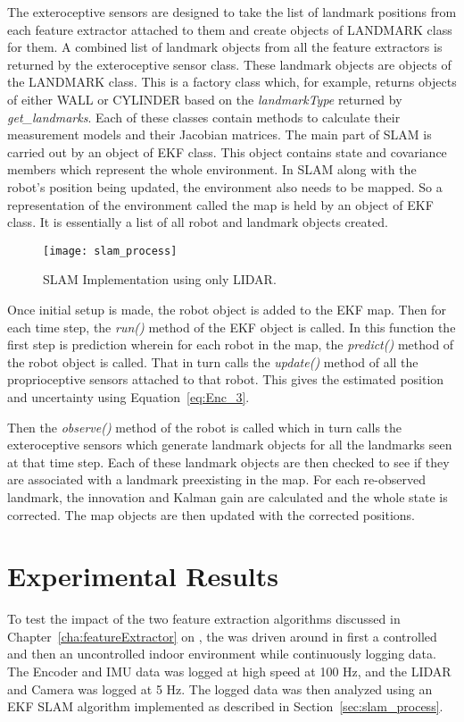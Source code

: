 The exteroceptive sensors are designed to take the list of landmark positions from each feature extractor attached to them and create objects of LANDMARK class for them. A combined list of landmark objects from all the feature extractors is returned by the exteroceptive sensor class. These landmark objects are objects of the LANDMARK class. This is a factory class which, for example, returns objects of either WALL or CYLINDER based on the \textit{landmarkType} returned by \textit{get\_landmarks}. Each of these classes contain methods to calculate their measurement models and their Jacobian matrices.
The main part of SLAM is carried out by an object of EKF class. This object contains  state and covariance members which represent the whole environment. In SLAM along with the robot's position being updated, the environment also needs to be mapped. So a representation of the environment called the map is held by an object of EKF class. It is essentially a list of all robot and landmark objects created.

\begin{figure}
\centering
\texttt{[image: slam\_process]}
\caption{SLAM Implementation using only LIDAR.}
\label{fig:slam_process}
\end{figure}
Once initial setup is made, the robot object is added to the EKF map. Then for each time step, the \textit{run()} method of the EKF object is called. In this function the first step is prediction wherein for each robot in the map, the \textit{predict()} method of the robot object is called. That in turn calls the \textit{update()} method of all the proprioceptive sensors attached to that robot. This gives the estimated position and uncertainty using Equation~\ref{eq:Enc_3}. 

Then the \textit{observe()} method of the robot is called which in turn calls the exteroceptive sensors which generate landmark objects for all the landmarks seen at that time step. Each of these landmark objects are then checked to see if they are associated with a landmark preexisting in the map. For each re-observed landmark, the innovation and Kalman gain are calculated and the whole state is corrected. The map objects are then updated with the corrected positions. 

\section{Experimental Results}

To test the impact of the two feature extraction algorithms discussed in Chapter~\ref{cha:featureExtractor} on \slam, the \imp was driven around in first a controlled and then an uncontrolled indoor environment while continuously logging data. The Encoder and IMU data was logged at high speed at 100 Hz, and the LIDAR and Camera was logged at 5 Hz. The logged data was then analyzed using an EKF SLAM algorithm implemented as described in Section~\ref{sec:slam_process}. 

